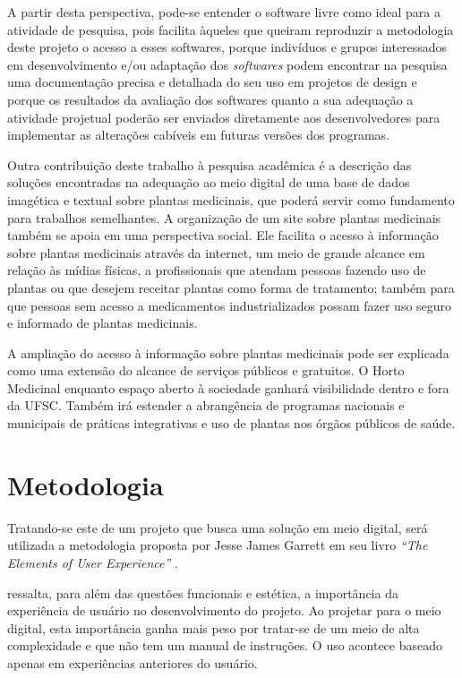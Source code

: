 A partir desta perspectiva, pode-se entender o software livre como ideal para a atividade de pesquisa, pois facilita àqueles que queiram reproduzir a metodologia deste projeto o acesso a esses softwares, porque indivíduos e grupos interessados em desenvolvimento e/ou adaptação dos \emph{softwares} podem encontrar na pesquisa uma documentação precisa e detalhada do seu uso em projetos de design e porque os resultados da avaliação dos softwares quanto a sua adequação a atividade projetual poderão ser enviados diretamente aos desenvolvedores para implementar as alterações cabíveis em futuras versões dos programas.

Outra contribuição deste trabalho à pesquisa acadêmica é a descrição das soluções encontradas na adequação ao meio digital de uma base de dados imagética e textual sobre plantas medicinais, que poderá servir como fundamento para trabalhos semelhantes. A organização de um site sobre plantas medicinais também se apoia em uma perspectiva social. Ele facilita o acesso à informação sobre plantas medicinais através da internet, um meio de grande alcance em relação às mídias físicas, a profissionais que atendam pessoas fazendo uso de plantas ou que desejem receitar plantas como forma de tratamento; também para que pessoas sem acesso a medicamentos industrializados possam fazer uso seguro e informado de plantas medicinais.

A ampliação do acesso à informação sobre plantas medicinais pode ser explicada como uma extensão do alcance de serviços públicos e gratuitos. O Horto Medicinal enquanto espaço aberto à sociedade ganhará visibilidade dentro e fora da UFSC. Também irá estender a abrangência de programas nacionais e municipais de práticas integrativas e uso de plantas nos órgãos públicos de saúde.

\section{Metodologia}\label{metodologia}

Tratando-se este de um projeto que busca uma solução em meio digital, será utilizada a metodologia proposta por Jesse James Garrett em seu livro \emph{``The Elements of User Experience'' } \textcite{garret02}.

\textcite{garret02} ressalta, para além das questões funcionais e estética, a importância da experiência de usuário no desenvolvimento do projeto. Ao projetar para o meio digital, esta importância ganha mais peso por tratar-se de um meio de alta complexidade e que não tem um manual de instruções. O uso acontece baseado apenas em experiências anteriores do usuário.

